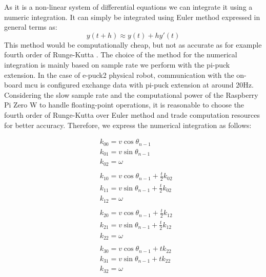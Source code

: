 As it is a non-linear system of differential equations we can integrate it using a numeric integration.
It can simply be integrated using Euler method expressed in general terms as:
\begin{equation}
    y(t + h) \approx y(t) + h y'(t)
\end{equation}
This method would be computationally cheap, but not as accurate as for example fourth order of Runge-Kutta \cite[p. 40]{noauthor_solving_1993}.
The choice of the method for the numerical integration is mainly based on sample rate we perform with the pi-puck extension.
In the case of e-puck2 physical robot, communication with the on-board \ac{mcu} is configured exchange data with pi-puck extension at around 20Hz.
Considering the slow sample rate and the computational power of the Raspberry Pi Zero W to handle floating-point operations, it is reasonable to choose the fourth order of Runge-Kutta over Euler method and trade computation resources for better accuracy.
Therefore, we express the numerical integration as follows:


\begin{equation}
\begin{aligned}
    & k_{00} = v \cos{\theta_{n-1}} \\
    & k_{01} = v \sin{\theta_{n-1}} \\
    & k_{02} = \omega \\
    & \\
    & k_{10} = v \cos{\theta_{n-1} + \frac{t}{2}k_{02}} \\
    & k_{11} = v \sin{\theta_{n-1} + \frac{t}{2}k_{02}} \\
    & k_{12} = \omega \\
    & \\
    & k_{20} = v \cos{\theta_{n-1} + \frac{t}{2}k_{12}} \\
    & k_{21} = v \sin{\theta_{n-1} + \frac{t}{2}k_{12}} \\
    & k_{22} = \omega \\
    & \\
    & k_{30} = v \cos{\theta_{n-1} + t k_{22}} \\
    & k_{31} = v \sin{\theta_{n-1} + t k_{22}} \\
    & k_{32} = \omega
\end{aligned}
\end{equation}

